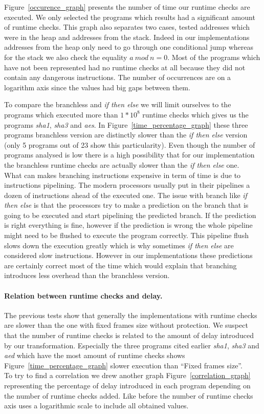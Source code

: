 \documentclass[11pt]{sdm}
\begin{document}
Figure~\ref{occurence_graph} presents the number of time our runtime checks are executed. We only selected the programs which results had a significant amount of runtime checks. This graph also separates two cases, tested addresses which were in the heap and addresses from the stack. Indeed in our implementations addresses from the heap only need to go through one conditional jump whereas for the stack we also check the equality $a~mod~n=0$.
Most of the programs which have not been represented had no runtime checks at all because they did not contain any dangerous instructions.
The number of occurrences are on a logarithm axis since the values had big gaps between them.

To compare the branchless and \textit{if then else} we will limit ourselves to the programs which executed more than $1*10^8$ runtime checks which gives us the programs \textit{sha1}, \textit{sha3} and \textit{aes}. In Figure~\ref{time_percentage_graph} these three programs branchless version are distinctly slower than the \textit{if then else} version (only 5 programs out of 23 show this particularity). Even though the number of programs analysed is low there is a high possibility that for our implementation the branchless runtime checks are actually slower than the \textit{if then else} one.\\
What can makes branching instructions expensive in term of time is due to instructions pipelining. 
The modern processors usually put in their pipelines a dozen of instructions ahead of the executed one. 
The issue with branch like \textit{if then else} is that the processors try to make a prediction on the branch that is going to be executed and start pipelining the predicted branch.
If the prediction is right everything is fine, however if the prediction is wrong the whole pipeline might need to be flushed to execute the program correctly. This pipeline flush slows down the execution greatly which is why sometimes \textit{if then else} are considered slow instructions.
However in our implementations these predictions are certainly correct most of the time which would explain that branching introduces less overhead than the branchless version.

\paragraph{Relation between runtime checks and delay.}

The previous tests show that generally the implementations with runtime checks are slower than the one with fixed frames size without protection. We suspect that the number of runtime checks is related to the amount of delay introduced by our transformation. 
Especially the three programs cited earlier \textit{sha1}, \textit{sha3} and \textit{aed} which have the most amount of runtime checks shows Figure~\ref{time_percentage_graph} slower execution than ``Fixed frames size''. \\
To try to find a correlation we drew another graph Figure~\ref{correlation_graph} representing the percentage of delay introduced in each program depending on the number of runtime checks added. Like before the number of runtime checks axis uses a logarithmic scale to include all obtained values.
\end{document}
